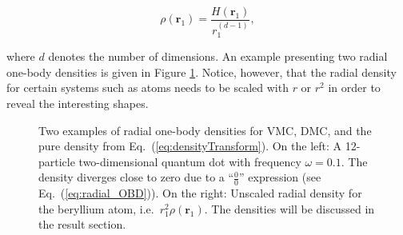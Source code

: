 \begin{equation}
 \rho(\mathbf{r}_1) = \frac{H(\mathbf{r}_1)}{r_1^{(d-1)}},\label{eq:radial_OBD}
\end{equation}

where $d$ denotes the number of dimensions. An example presenting two radial one-body densities is given in Figure \ref{fig:OBD_ex}. Notice, however, that the radial density for certain systems such as atoms needs to be scaled with $r$ or $r^2$ in order to reveal the interesting shapes. 

\begin{figure}
 \begin{center}
  \caption{Two examples of radial one-body densities for VMC, DMC, and the pure density from Eq.~(\ref{eq:densityTransform}). On the left: A 12-particle two-dimensional quantum dot with frequency $\omega=0.1$. The density diverges close to zero due to a ``$\frac{0}{0}$'' expression (see Eq.~(\ref{eq:radial_OBD})). On the right: Unscaled radial density for the beryllium atom, i.e.~$r_1^2\rho(\mathbf{r}_1)$. The densities will be discussed in the result section.}
  \label{fig:OBD_ex}
 \end{center}
\end{figure}



